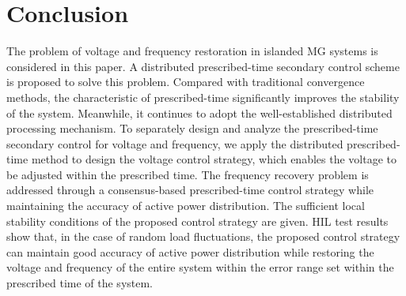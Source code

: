 \documentclass[]{interact}
\theoremstyle{plain}%
\theoremstyle{definition}
\theoremstyle{remark}
\begin{document}
\section{Conclusion}
The problem of voltage and frequency restoration in islanded MG systems is considered in this paper. A distributed prescribed-time secondary control scheme is proposed to solve this problem. Compared with traditional convergence methods, the characteristic of prescribed-time significantly improves the stability of the system. 
Meanwhile, it continues to adopt the well-established distributed processing mechanism. To separately design and analyze the prescribed-time secondary control for voltage and frequency, we apply the distributed prescribed-time method to design the voltage control strategy, which enables the voltage to be adjusted within the prescribed time. The frequency recovery problem is addressed through a consensus-based prescribed-time control strategy while maintaining the accuracy of active power distribution. The sufficient local stability conditions of the proposed control strategy are given. HIL test results show that, in the case of random load fluctuations, the proposed control strategy can maintain good accuracy of active power distribution while restoring the voltage and frequency of the entire system within the error range set within the prescribed time of the system.






\end{document}
